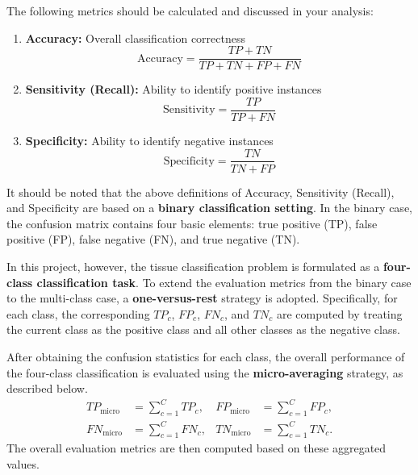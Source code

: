 \documentclass[11pt]{article}
\begin{document}
The following metrics should be calculated and discussed in your analysis:

\begin{enumerate}[label=\roman*).]
    \item \textbf{Accuracy:} Overall classification correctness
    \begin{equation}
        \mathrm{Accuracy}=\frac{TP+TN}{TP+TN+FP+FN}
    \end{equation}

    \item \textbf{Sensitivity (Recall):} Ability to identify positive instances
    \begin{equation}
        \mathrm{Sensitivity}=\frac{TP}{TP+FN}
    \end{equation}

    \item \textbf{Specificity:} Ability to identify negative instances
    \begin{equation}
        \mathrm{Specificity}=\frac{TN}{TN+FP}
    \end{equation}
\end{enumerate}

It should be noted that the above definitions of Accuracy, Sensitivity (Recall), and Specificity are based on a \textbf{binary classification setting}. In the binary case, the confusion matrix contains four basic elements: true positive (TP), false positive (FP), false negative (FN), and true negative (TN).

In this project, however, the tissue classification problem is formulated as a \textbf{four-class classification task}. To extend the evaluation metrics from the binary case to the multi-class case, a \textbf{one-versus-rest} strategy is adopted. Specifically, for each class, the corresponding $TP_c$, $FP_c$, $FN_c$, and $TN_c$ are computed by treating the current class as the positive class and all other classes as the negative class.

After obtaining the confusion statistics for each class, the overall performance of the four-class classification is evaluated using the \textbf{micro-averaging} strategy, as described below.
\begin{equation}
\begin{aligned}
    TP_{\mathrm{micro}}&=\sum_{c=1}^{C}TP_c, &
    FP_{\mathrm{micro}}&=\sum_{c=1}^{C}FP_c, \\
    FN_{\mathrm{micro}}&=\sum_{c=1}^{C}FN_c, &
    TN_{\mathrm{micro}}&=\sum_{c=1}^{C}TN_c.
\end{aligned}
\end{equation}
The overall evaluation metrics are then computed based on these aggregated values.
\end{document}
